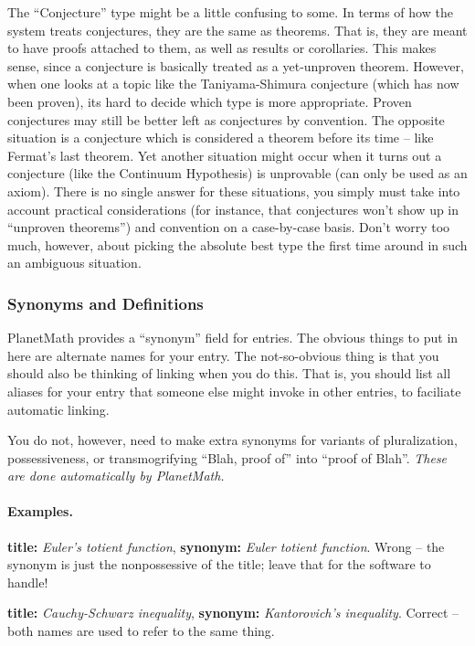 The ``Conjecture'' type might be a little confusing to some. In terms
of how the system treats conjectures, they are the same as
theorems. That is, they are meant to have proofs attached to them, as
well as results or corollaries. This makes sense, since a conjecture
is basically treated as a yet-unproven theorem. However, when one
looks at a topic like the Taniyama-Shimura conjecture (which has now
been proven), its hard to decide which type is more
appropriate. Proven conjectures may still be better left as
conjectures by convention. The opposite situation is a conjecture
which is considered a theorem before its time -- like Fermat's last
theorem. Yet another situation might occur when it turns out a
conjecture (like the Continuum Hypothesis) is unprovable (can only be
used as an axiom). There is no single answer for these situations, you
simply must take into account practical considerations (for instance,
that conjectures won't show up in ``unproven theorems'') and
convention on a case-by-case basis. Don't worry too much, however,
about picking the absolute best type the first time around in such an
ambiguous situation.

\subsubsection{Synonyms and Definitions}
PlanetMath provides a ``synonym'' field for entries. The obvious
things to put in here are alternate names for your entry. The
not-so-obvious thing is that you should also be thinking of linking
when you do this. That is, you should list all aliases for your entry
that someone else might invoke in other entries, to faciliate
automatic linking.

You do not, however, need to make extra synonyms for variants of
pluralization, possessiveness, or transmogrifying ``Blah, proof of''
into ``proof of Blah''. \emph{These are done automatically by
PlanetMath.}

\paragraph{Examples.}
{\bf title:} \emph{Euler's totient function}, {\bf synonym:}
\emph{Euler totient function}. Wrong -- the synonym is just the
nonpossessive of the title; leave that for the software to handle!

{\bf title:} \emph{Cauchy-Schwarz inequality}, {\bf synonym:} \emph{Kantorovich's inequality}.
Correct -- both names are used to refer to the same thing.

